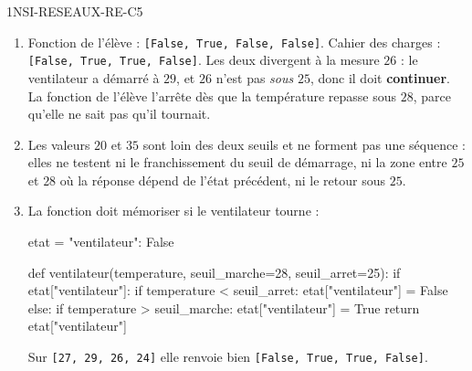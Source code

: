 \begin{corrige}{1NSI-RESEAUX-RE-C5}
\begin{enumerate}
  \item Fonction de l'élève : \lstinline{[False, True, False, False]}. Cahier des charges :
        \lstinline{[False, True, True, False]}. Les deux divergent à la mesure $26$ : le
        ventilateur a démarré à $29$, et $26$ n'est pas \emph{sous} $25$, donc il doit
        \textbf{continuer}. La fonction de l'élève l'arrête dès que la température repasse
        sous $28$, parce qu'elle ne sait pas qu'il tournait.
  \item Les valeurs $20$ et $35$ sont loin des deux seuils et ne forment pas une séquence :
        elles ne testent ni le franchissement du seuil de démarrage, ni la zone entre $25$
        et $28$ où la réponse dépend de l'état précédent, ni le retour sous $25$.
  \item La fonction doit mémoriser si le ventilateur tourne :
\begin{python}
etat = {"ventilateur": False}

def ventilateur(temperature, seuil_marche=28, seuil_arret=25):
    if etat["ventilateur"]:
        if temperature < seuil_arret:
            etat["ventilateur"] = False
    else:
        if temperature > seuil_marche:
            etat["ventilateur"] = True
    return etat["ventilateur"]
\end{python}
        Sur \lstinline{[27, 29, 26, 24]} elle renvoie bien
        \lstinline{[False, True, True, False]}.
\end{enumerate}
\end{corrige}
